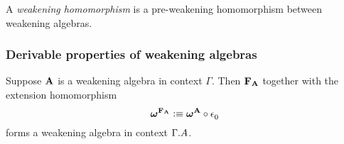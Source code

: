 \begin{defn}
A \emph{weakening homomorphism} is a pre-weakening homomorphism between
weakening algebras.
\end{defn}

\subsubsection{Derivable properties of weakening algebras}

\begin{thm}
Suppose $\mathbf{A}$ is a weakening algebra in context $\Gamma$. Then
$\mathbf{F}_{\mathbf{A}}$ together with the extension homomorphism
\begin{equation*}
\cftwk{\cftfamalg{\cftalg{A}}}
  \defeq \jcomp{}{\cftctxext}{\cftwk{\cftalg{A}}}
\end{equation*}
forms a weakening algebra in context $\ctxext{\Gamma}{\cftalgc{\cftalg{A}}}$.
\end{thm}

